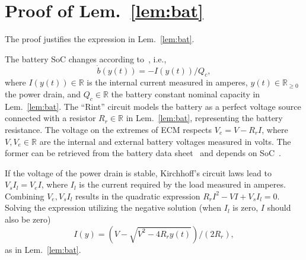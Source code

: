 \documentclass[letterpaper,10pt,journal,twoside]{IEEEtran}
\theoremstyle{definition}
\begin{document}
\section{Proof of Lem.~\ref{lem:bat}}
\label{app:proof-bat}{\small

The proof justifies the expression in Lem.~\ref{lem:bat}.

The battery SoC changes according to~\cite{hasan2018exogenous,zhang2018online}, i.e.,
\begin{equation}
  \dot{b}(y(t))=-I(y(t))/Q_c,
\end{equation}
where $I(y(t))\in\mathbb{R}$ is the internal current measured in amperes, $y(t)\in\mathbb{R}_{\geq 0}$ the power drain, and $Q_c\in\mathbb{R}$ the battery constant nominal capacity in Lem.~\ref{lem:bat}. The ``Rint'' circuit models the battery as a perfect voltage source connected with a resistor $R_r\in\mathbb{R}$ in Lem.~\ref{lem:bat}, representing the battery resistance. The voltage on the extremes of ECM respects $V_e=V-R_rI$, where $V,V_e\in\mathbb{R}$ are the internal and external battery voltages measured in volts. The former can be retrieved from the battery data sheet~\cite{hinz2019comparison} and depends on SoC~\cite{hasan2018exogenous}.

If the voltage of the power drain is stable, Kirchhoff's circuit laws lead to $V_sI_l=V_eI$, where $I_l$ is the current required by the load measured in amperes. Combining $V_e,V_sI_l$ results in the quadratic expression $R_rI^2-VI+V_sI_l=0$. Solving the expression utilizing the negative solution (when $I_l$ is zero, $I$ should also be zero)%
\begin{equation}
I(y)=(V-\sqrt{V^2-4R_ry(t)})/(2R_r),
\end{equation} 
as in Lem.~\ref{lem:bat}. 


}

\leavevmode\thispagestyle{empty}\newpage
\leavevmode\thispagestyle{empty}\newpage
\end{document}
